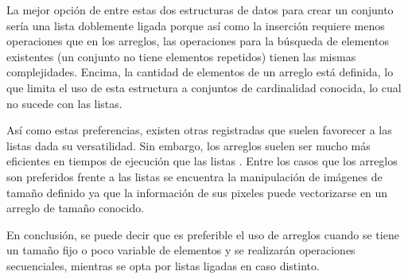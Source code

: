 \documentclass[paper=leter, fontsize=11pt]{scrartcl}
\numberwithin{equation}{section}		%
\numberwithin{figure}{section}			%
\numberwithin{table}{section}				%
\begin{document}
La mejor opción de entre estas dos estructuras de datos para crear un conjunto sería una lista doblemente ligada porque así como la inserción requiere menos operaciones que en los arreglos, las operaciones para la búsqueda de elementos existentes (un conjunto no tiene elementos repetidos) tienen las mismas complejidades. Encima, la cantidad de elementos de un arreglo está definida, lo que limita el uso de esta estructura a conjuntos de cardinalidad conocida, lo cual no sucede con las listas.

Así como estas preferencias, existen otras registradas que suelen favorecer a las listas dada su versatilidad. Sin embargo, los arreglos suelen ser mucho más eficientes en tiempos de ejecución que las listas \nocite{arrayVSlist}. Entre los casos que los arreglos son preferidos frente a las listas se encuentra la manipulación de imágenes de tamaño definido ya que la información de sus pixeles puede vectorizarse en un arreglo de tamaño conocido.

En conclusión, se puede decir que es preferible el uso de arreglos cuando se tiene un tamaño fijo o poco variable de elementos y se realizarán operaciones secuenciales, mientras se opta por listas ligadas en caso distinto.



\end{document}
